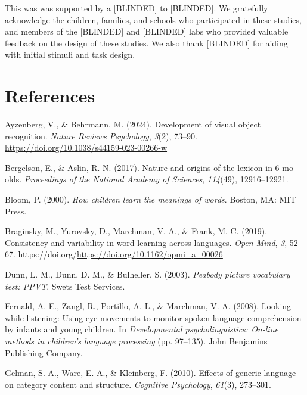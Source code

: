 \documentclass[
  man,mask]{apa6}
\newlength{\cslhangindent}
\newenvironment{CSLReferences}[2] %
 {\begin{list}{}{%
  \setlength{\itemindent}{0pt}
  \setlength{\leftmargin}{0pt}
  \setlength{\parsep}{0pt}
  \ifodd #1
   \setlength{\leftmargin}{\cslhangindent}
   \setlength{\itemindent}{-1\cslhangindent}
  \fi
  \setlength{\itemsep}{#2\baselineskip}}}
 {\end{list}}
\begin{document}
This was was supported by a {[}BLINDED{]} to {[}BLINDED{]}. We gratefully acknowledge the children, families, and schools who participated in these studies, and members of the {[}BLINDED{]} and {[}BLINDED{]} labs who provided valuable feedback on the design of these studies. We also thank {[}BLINDED{]} for aiding with initial stimuli and task design.

\section{References}\label{references}

\label{refs}
\begin{CSLReferences}{1}{0}
Ayzenberg, V., \& Behrmann, M. (2024). Development of visual object recognition. \emph{Nature Reviews Psychology}, \emph{3}(2), 73--90. \url{https://doi.org/10.1038/s44159-023-00266-w}

Bergelson, E., \& Aslin, R. N. (2017). Nature and origins of the lexicon in 6-mo-olds. \emph{Proceedings of the National Academy of Sciences}, \emph{114}(49), 12916--12921.

Bloom, P. (2000). \emph{How children learn the meanings of words}. Boston, MA: MIT Press.

Braginsky, M., Yurovsky, D., Marchman, V. A., \& Frank, M. C. (2019). Consistency and variability in word learning across languages. \emph{Open Mind}, \emph{3}, 52--67. https://doi.org/\url{https://doi.org/10.1162/opmi_a_00026}

Dunn, L. M., Dunn, D. M., \& Bulheller, S. (2003). \emph{Peabody picture vocabulary test: PPVT}. Swets Test Services.

Fernald, A. E., Zangl, R., Portillo, A. L., \& Marchman, V. A. (2008). Looking while listening: Using eye movements to monitor spoken language comprehension by infants and young children. In \emph{Developmental psycholinguistics: On-line methods in children's language processing} (pp. 97--135). John Benjamins Publishing Company.

Gelman, S. A., Ware, E. A., \& Kleinberg, F. (2010). Effects of generic language on category content and structure. \emph{Cognitive Psychology}, \emph{61}(3), 273--301.


\end{CSLReferences}
\end{document}
